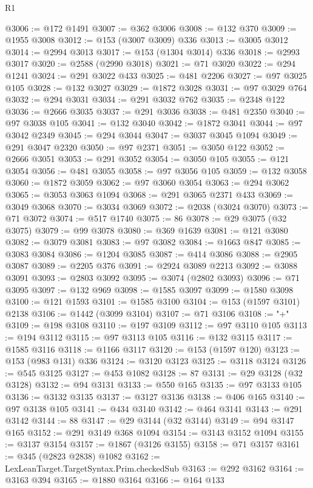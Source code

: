 \begin{lexlean}{R1}
\begin{coremodule}
{{{{{{{{{{{{{{{{{{{{{{{{{{{{{{{{{{{{{{{{{{{{{{{{{{{{{{{{{{{{{{{{{{{{{{{{{{{{{{{{{{{{{{{{{{{{{{{{{{{{{{{{{{{{{{{{{{{{{{{{{{{{{{{{{{{{{{{{{{{{{{{{{{{{{{{{{{{{{{{{{{{{{{{{{{{{{{{{{{{{{{{{{{@3006 := @172 @1491
@3007 := @362 @3006
@3008 := @132 @370
@3009 := @1955 @3008
@3012 := @153 (@3007 @3009) @336
@3013 := @3005 @3012
@3014 := @2994 @3013
@3017 := @153 (@1304 @3014) @336
@3018 := @2993 @3017
@3020 := @2588 (@2990 @3018)
@3021 := @71 @3020
@3022 := @294 @1241
@3024 := @291 @3022 @433
@3025 := @481 @2206
@3027 := @97 @3025 @105
@3028 := @132 @3027
@3029 := @1872 @3028
@3031 := @97 @3029 @764
@3032 := @294 @3031
@3034 := @291 @3032 @762
@3035 := @2348 @122
@3036 := @2666 @3035
@3037 := @291 @3036
@3038 := @481 @2350
@3040 := @97 @3038 @105
@3041 := @132 @3040
@3042 := @1872 @3041
@3044 := @97 @3042 @2349
@3045 := @294 @3044
@3047 := @3037 @3045 @1094
@3049 := @291 @3047 @2320
@3050 := @97 @2371
@3051 := @3050 @122
@3052 := @2666 @3051
@3053 := @291 @3052
@3054 := @3050 @105
@3055 := @121 @3054
@3056 := @481 @3055
@3058 := @97 @3056 @105
@3059 := @132 @3058
@3060 := @1872 @3059
@3062 := @97 @3060 @3054
@3063 := @294 @3062
@3065 := @3053 @3063 @1094
@3068 := @291 @3065 @2371 @433
@3069 := @3049 @3068
@3070 := @3034 @3069
@3072 := @2038 (@3024 @3070)
@3073 := @71 @3072
@3074 := @517 @1740
@3075 := 86
@3078 := @29 @3075 (@32 @3075)
@3079 := @99 @3078
@3080 := @369 @1639
@3081 := @121 @3080
@3082 := @3079 @3081
@3083 := @97 @3082
@3084 := @1663 @847
@3085 := @3083 @3084
@3086 := @1204 @3085
@3087 := @414 @3086
@3088 := @2905 @3087
@3089 := @2205 @376
@3091 := @2924 @3089 @2213
@3092 := @3088 @3091
@3093 := @2803 @3092
@3095 := @3074 (@2802 @3093)
@3096 := @71 @3095
@3097 := @132 @969
@3098 := @1585 @3097
@3099 := @1580 @3098
@3100 := @121 @1593
@3101 := @1585 @3100
@3104 := @153 (@1597 @3101) @2138
@3106 := @1442 (@3099 @3104)
@3107 := @71 @3106
@3108 := "+"
@3109 := @198 @3108
@3110 := @197 @3109
@3112 := @97 @3110 @105
@3113 := @194 @3112
@3115 := @97 @3113 @105
@3116 := @132 @3115
@3117 := @1585 @3116
@3118 := @1166 @3117
@3120 := @153 (@1597 @120)
@3123 := @153 (@983 @131) @336
@3124 := @3120 @3123
@3125 := @3118 @3124
@3126 := @545 @3125
@3127 := @453 @1082
@3128 := 87
@3131 := @29 @3128 (@32 @3128)
@3132 := @94 @3131
@3133 := @550 @165
@3135 := @97 @3133 @105
@3136 := @3132 @3135
@3137 := @3127 @3136
@3138 := @406 @165
@3140 := @97 @3138 @105
@3141 := @434 @3140
@3142 := @464 @3141
@3143 := @291 @3142
@3144 := 88
@3147 := @29 @3144 (@32 @3144)
@3149 := @94 @3147 @165
@3152 := @291 @3149 @368 @1094
@3154 := @3143 @3152 @1094
@3155 := @3137 @3154
@3157 := @1867 (@3126 @3155)
@3158 := @71 @3157
@3161 := @345 (@2823 @2838) @1082
@3162 := LexLeanTarget.TargetSyntax.Prim.checkedSub
@3163 := @292 @3162
@3164 := @3163 @394
@3165 := @1880 @3164
@3166 := @164 @133
}}}}}}}}}}}}}}}}}}}}}}}}}}}}}}}}}}}}}}}}}}}}}}}}}}}}}}}}}}}}}}}}}}}}}}}}}}}}}}}}}}}}}}}}}}}}}}}}}}}}}}}}}}}}}}}}}}}}}}}}}}}}}}}}}}}}}}}}}}}}}}}}}}}}}}}}}}}}}}}}}}}}}}}}}}}}}}}}}}}}}}}}}}
\end{coremodule}
\end{lexlean}
